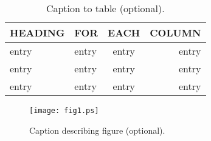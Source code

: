 \documentclass[abstract]{iucr}              %
\begin{document}
\begin{references}
\end{references}



\begin{table}
\caption{Caption to table (optional).}
\begin{tabular}{llcr}      %
 HEADING    & FOR        & EACH       & COLUMN     \\
\hline
 entry      & entry      & entry      & entry      \\
 entry      & entry      & entry      & entry      \\
 entry      & entry      & entry      & entry      \\
\end{tabular}
\end{table}


\begin{figure}
\caption{Caption describing figure (optional).}
\texttt{[image: fig1.ps]}
\end{figure}
\end{document}
